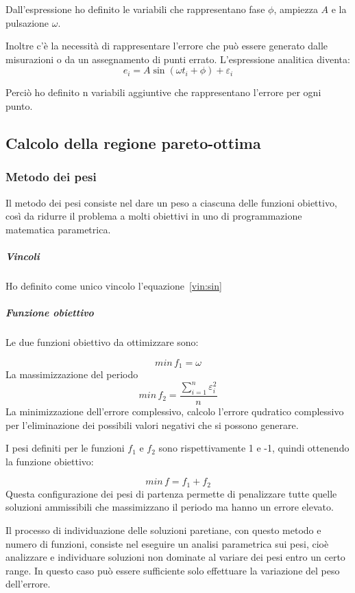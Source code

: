 \documentclass[a4paper,12pt]{report}
\begin{document}
Dall'espressione ho definito le variabili che rappresentano fase $ \phi $, ampiezza $ A $  e la pulsazione $\omega$.

Inoltre c'è la necessità di rappresentare l'errore che può essere generato dalle misurazioni o da un assegnamento di punti errato. L'espressione analitica diventa:
\begin{equation}
\label{vin:sin}
e_i = A\sin(\omega t_i + \phi) + \varepsilon_i
\end{equation}

Perciò ho definito n variabili aggiuntive che rappresentano l'errore per ogni punto.
\subsection{Calcolo della regione pareto-ottima}

\subsubsection{Metodo dei pesi}
Il metodo dei pesi consiste nel dare un peso a ciascuna delle funzioni obiettivo, così da ridurre il problema a molti obiettivi in uno di programmazione matematica parametrica.

\subparagraph{Vincoli}
Ho definito come unico vincolo l'equazione~\eqref{vin:sin}

\subparagraph{Funzione obiettivo}
Le due funzioni obiettivo da ottimizzare sono:

\begin{equation}
\label{fo:periodo}
min \, f_1 = \omega
\end{equation}
La massimizzazione del periodo
\begin{equation}
\label{fo:errore}
min \, f_2 = \frac{\sum_{i=1}^n \varepsilon_i^2}{n}
\end{equation}
La minimizzazione dell'errore complessivo, calcolo l'errore qudratico complessivo per l'eliminazione dei possibili valori negativi che si possono generare.

I pesi definiti per le funzioni $ f_1 $ e $ f_2 $ sono rispettivamente 1 e -1, quindi ottenendo la funzione obiettivo:

\begin{equation}
min \, f = f_1 + f_2
\end{equation}
Questa configurazione dei pesi di partenza permette di penalizzare tutte quelle soluzioni ammissibili che massimizzano il periodo ma hanno un errore elevato.

Il processo di individuazione delle soluzioni paretiane, con questo metodo e numero di funzioni, consiste nel eseguire un analisi parametrica sui pesi, cioè analizzare e individuare soluzioni non dominate al variare dei pesi entro un certo range. In questo caso può essere sufficiente solo effettuare la variazione del peso dell'errore.
\end{document}
